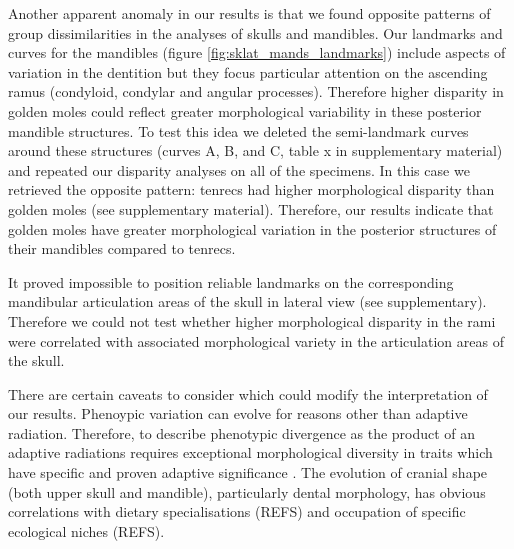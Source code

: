 \documentclass[12pt,a4paper]{article}
\begin{document}
	
	Another apparent anomaly in our results is that we found opposite patterns of group dissimilarities in the analyses of skulls and mandibles. 
	Our landmarks and curves for the mandibles (figure \ref{fig:sklat_mands_landmarks}) include aspects of variation in the dentition but they focus particular attention on the ascending ramus (condyloid, condylar and angular processes). Therefore higher disparity in golden moles could reflect greater morphological variability in these posterior mandible structures. To test this idea we deleted the semi-landmark curves around these structures (curves A, B, and C, table x in supplementary material) and repeated our disparity analyses on all of the specimens. In this case we retrieved the opposite pattern: tenrecs had higher morphological disparity than golden moles (see supplementary material).
	Therefore, our results indicate that golden moles have greater morphological variation in the posterior structures of their mandibles compared to tenrecs.
		
 	It proved impossible to position reliable landmarks on the corresponding mandibular articulation areas of the skull in lateral view (see supplementary). Therefore we could not test whether higher morphological disparity in the rami were correlated with associated morphological variety in the articulation areas of the skull.
	
	




	There are certain caveats to consider which could modify the interpretation of our results.
	Phenoypic variation can evolve for reasons other than adaptive radiation. Therefore, to describe phenotypic divergence as the product of an adaptive radiations requires exceptional morphological diversity in traits which have specific and proven adaptive significance \citep{Losos2010a}. The evolution of cranial shape (both upper skull and mandible), particularly dental morphology, has obvious correlations with dietary specialisations (REFS) and occupation of specific ecological niches (REFS). %
\end{document}
